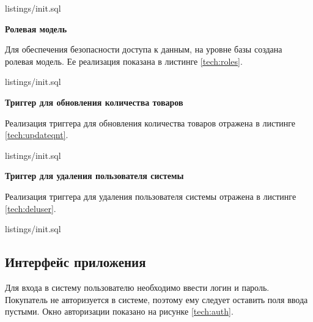 \pagebreak


{listings/init.sql}

\pagebreak

\textbf{Ролевая модель}

Для обеспечения безопасности доступа к данным, на уровне базы создана ролевая модель. Ее реализация показана в листинге \ref{tech:roles}.


{listings/init.sql}

\pagebreak

\textbf{Триггер для обновления количества товаров}

Реализация триггера для обновления количества товаров отражена в листинге \ref{tech:updateqnt}.


{listings/init.sql}

\textbf{Триггер для удаления пользователя системы}

Реализация триггера для удаления пользователя системы отражена в листинге \ref{tech:deluser}.


{listings/init.sql}

\pagebreak

\subsection{Интерфейс приложения}

Для входа в систему пользователю необходимо ввести логин и пароль. Покупатель не авторизуется в системе, поэтому ему следует оставить поля ввода пустыми. Окно авторизации показано на рисунке \ref{tech:auth}.

\begin{figure}[H]
\end{figure}

